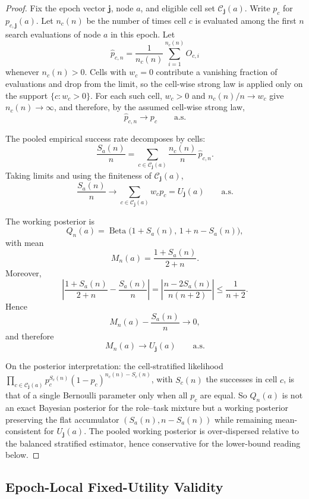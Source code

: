 \begin{proof}
Fix the epoch vector \(\boldsymbol{j}\), node \(a\), and eligible cell set
\(\mathcal C_{\boldsymbol{j}}(a)\). Write \(p_c\) for \(p_{c,\boldsymbol{j}}(a)\).
Let \(n_c(n)\) be the number of times cell \(c\) is evaluated among the first
\(n\) search evaluations of node \(a\) in this epoch. Let
\[
\widehat p_{c,n}
=
\frac{1}{n_c(n)}
\sum_{i=1}^{n_c(n)} O_{c,i}
\]
whenever \(n_c(n)>0\). Cells with \(w_c=0\) contribute a vanishing fraction of evaluations and drop from the limit, so the cell-wise strong law is applied only on the support \(\{c:w_c>0\}\). For each such cell, \(w_c>0\) and \(n_c(n)/n\to w_c\) give \(n_c(n)\to\infty\), and therefore, by the assumed cell-wise strong law,
\[
\widehat p_{c,n}
\longrightarrow
p_c
\qquad\text{a.s.}
\]

The pooled empirical success rate decomposes by cells:
\[
\frac{S_a(n)}{n}
=
\sum_{c\in \mathcal C_{\boldsymbol{j}}(a)}
\frac{n_c(n)}{n}\,
\widehat p_{c,n}.
\]
Taking limits and using the finiteness of \(\mathcal C_{\boldsymbol{j}}(a)\),
\[
\frac{S_a(n)}{n}
\longrightarrow
\sum_{c\in \mathcal C_{\boldsymbol{j}}(a)}
w_c p_c
=
U_{\boldsymbol{j}}(a)
\qquad\text{a.s.}
\]

The \hgm working posterior is
\[
Q_n(a)
=
\operatorname{Beta}\bigl(1+S_a(n),\,1+n-S_a(n)\bigr),
\]
with mean
\[
M_n(a)
=
\frac{1+S_a(n)}{2+n}.
\]
Moreover,
\[
\left|
\frac{1+S_a(n)}{2+n}
-
\frac{S_a(n)}{n}
\right|
=
\left|
\frac{n-2S_a(n)}{n(n+2)}
\right|
\le
\frac{1}{n+2}.
\]
Hence
\[
M_n(a)-\frac{S_a(n)}{n}\longrightarrow 0,
\]
and therefore
\[
M_n(a)
\longrightarrow
U_{\boldsymbol{j}}(a)
\qquad\text{a.s.}
\]

On the posterior interpretation: the cell-stratified likelihood
\(\prod_{c\in\mathcal C_{\boldsymbol{j}}(a)} p_c^{S_c(n)}(1-p_c)^{n_c(n)-S_c(n)}\), with
\(S_c(n)\) the successes in cell \(c\), is that of a single Bernoulli parameter
only when all \(p_c\) are equal. So \(Q_n(a)\) is not an exact Bayesian posterior
for the role--task mixture but a working posterior preserving the flat \hgm
accumulator \((S_a(n),n-S_a(n))\) while remaining mean-consistent for \(U_{\boldsymbol{j}}(a)\).
The pooled working posterior is over-dispersed relative to the balanced
stratified estimator, hence conservative for the lower-bound reading below.
\end{proof}




\subsection{Epoch-Local Fixed-Utility Validity}
\label{app:proofs:epoch-local-validity}



